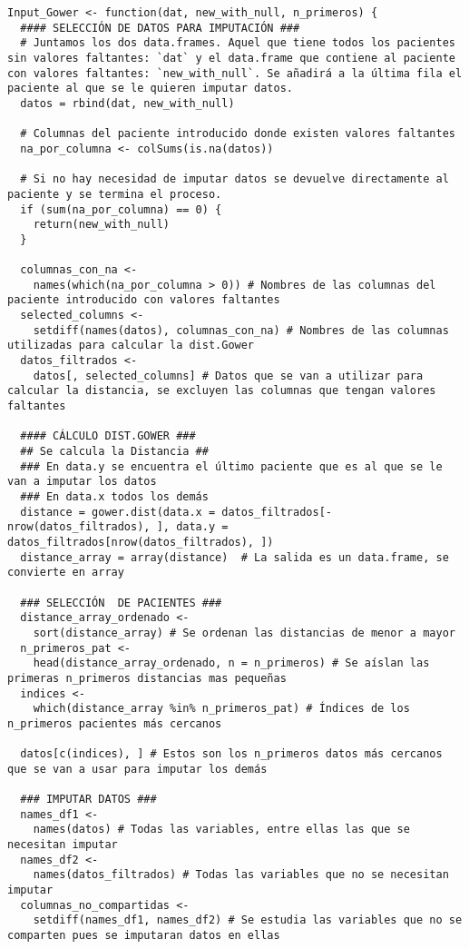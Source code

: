 \begin{lstlisting}[style=mystyle,caption={Input\_Gower.R}, label={lst:input-gower-fun}]
  Input_Gower <- function(dat, new_with_null, n_primeros) {
  #### SELECCIÓN DE DATOS PARA IMPUTACIÓN ###
  # Juntamos los dos data.frames. Aquel que tiene todos los pacientes sin valores faltantes: `dat` y el data.frame que contiene al paciente con valores faltantes: `new_with_null`. Se añadirá a la última fila el paciente al que se le quieren imputar datos.
  datos = rbind(dat, new_with_null)
  
  # Columnas del paciente introducido donde existen valores faltantes
  na_por_columna <- colSums(is.na(datos))
  
  # Si no hay necesidad de imputar datos se devuelve directamente al paciente y se termina el proceso.
  if (sum(na_por_columna) == 0) {
    return(new_with_null)
  }
  
  columnas_con_na <-
    names(which(na_por_columna > 0)) # Nombres de las columnas del paciente introducido con valores faltantes
  selected_columns <-
    setdiff(names(datos), columnas_con_na) # Nombres de las columnas utilizadas para calcular la dist.Gower
  datos_filtrados <-
    datos[, selected_columns] # Datos que se van a utilizar para calcular la distancia, se excluyen las columnas que tengan valores faltantes
  
  #### CÁLCULO DIST.GOWER ###
  ## Se calcula la Distancia ##
  ### En data.y se encuentra el último paciente que es al que se le van a imputar los datos
  ### En data.x todos los demás
  distance = gower.dist(data.x = datos_filtrados[-nrow(datos_filtrados), ], data.y =  datos_filtrados[nrow(datos_filtrados), ])
  distance_array = array(distance)  # La salida es un data.frame, se convierte en array
  
  ### SELECCIÓN  DE PACIENTES ###
  distance_array_ordenado <-
    sort(distance_array) # Se ordenan las distancias de menor a mayor
  n_primeros_pat <-
    head(distance_array_ordenado, n = n_primeros) # Se aíslan las primeras n_primeros distancias mas pequeñas
  indices <-
    which(distance_array %in% n_primeros_pat) # Índices de los n_primeros pacientes más cercanos
  
  datos[c(indices), ] # Estos son los n_primeros datos más cercanos que se van a usar para imputar los demás
  
  ### IMPUTAR DATOS ###
  names_df1 <-
    names(datos) # Todas las variables, entre ellas las que se necesitan imputar
  names_df2 <-
    names(datos_filtrados) # Todas las variables que no se necesitan imputar
  columnas_no_compartidas <-
    setdiff(names_df1, names_df2) # Se estudia las variables que no se comparten pues se imputaran datos en ellas
  

\end{lstlisting}
